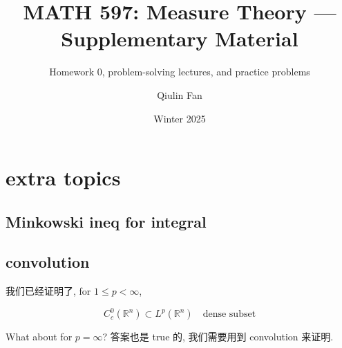 \documentclass{qlnotes-export}
\title{MATH 597: Measure Theory --- Supplementary Material}
\subtitle{Homework 0, problem-solving lectures, and practice problems}
\author{Qiulin Fan}
\date{Winter 2025}
\begin{document}
\mainmatter
\chapter{extra topics}\label{extra-topics}

\section{Minkowski ineq for integral}\label{minkowski-ineq-for-integral}

\section{convolution}\label{convolution}

我们已经证明了, for \(1 \leq p < \infty\),

\[C_{c}^{0}({\mathbb{R}}^{n}) \subset L^{p}({\mathbb{R}}^{n})\quad\text{dense subset}\]

What about for \(p = \infty\)? 答案也是 true 的, 我们需要用到 convolution 来证明.\\
\end{document}
